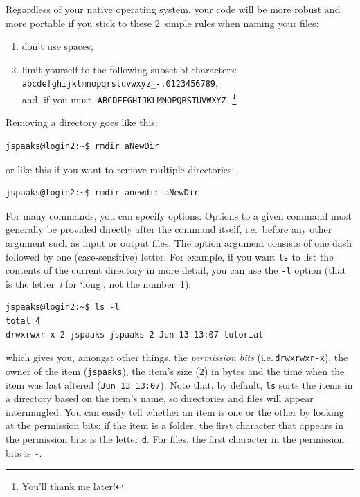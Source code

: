 Regardless of your native operating system, your code will be more robust and more portable if you stick to these 2~simple rules when naming your files:
\begin{enumerate}
\item{don't use spaces;}
\item{limit yourself to the following subset of characters:\\ \lstinline[style=bashinline]{abcdefghijklmnopqrstuvwxyz_-.0123456789},\\ and, if you must, \lstinline[style=bashinline]{ABCDEFGHIJKLMNOPQRSTUVWXYZ} .}\footnote{You'll thank me later!}
\end{enumerate}



Removing a directory goes like this:
\begin{lstlisting}[style=basic,style=bash]
jspaaks@login2:~$ rmdir aNewDir
\end{lstlisting}
or like this if you want to remove multiple directories:
\begin{lstlisting}[style=basic,style=bash]
jspaaks@login2:~$ rmdir anewdir aNewDir
\end{lstlisting}


For many commands, you can specify options. Options to a given command must generally be provided directly after the command itself, i.e.~before any other argument such as input or output files.  The option argument consists of one dash followed by one (case-sensitive) letter. For example, if you want \texttt{ls} to list the contents of the current directory in more detail, you can use the \texttt{-l} option (that is the letter~\textit{l} for `long', not the number~1):
\begin{lstlisting}[style=basic,style=bash]
jspaaks@login2:~$ ls -l
total 4
drwxrwxr-x 2 jspaaks jspaaks 2 Jun 13 13:07 tutorial
\end{lstlisting}
which gives you, amongst other things, the \textit{permission bits} (i.e.\,\lstinline{drwxrwxr-x}), the owner of the item (\lstinline{jspaaks}), the item's size (\lstinline{2}) in bytes and the time when the item was last altered (\lstinline{Jun 13 13:07}). Note that, by default, \lstinline[style=bashinline]{ls} sorts the items in a directory based on the item's name, so directories and files will appear intermingled. You can easily tell whether an item is one or the other by looking at the permission bits: if the item is a folder, the first character that appears in the permission bits is the letter \lstinline[style=bashinline]{d}. For files, the first character in the permission bits is \lstinline[style=bashinline]{-}.

